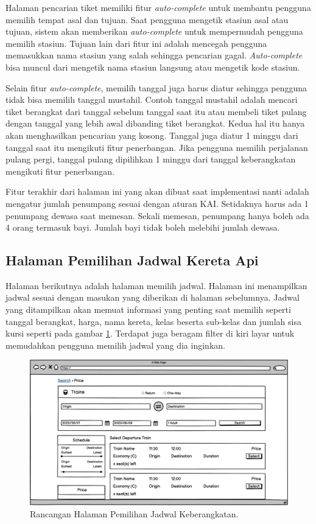 Halaman pencarian tiket memiliki fitur \textit{auto-complete} untuk membantu pengguna memilih tempat asal dan tujuan. Saat pengguna mengetik stasiun asal atau tujuan, sistem akan memberikan \textit{auto-complete} untuk mempermudah pengguna memilih stasiun. Tujuan lain dari fitur ini adalah mencegah pengguna memasukkan nama stasiun yang salah sehingga pencarian gagal. \textit{Auto-complete} bisa muncul dari mengetik nama stasiun langsung atau mengetik kode stasiun.

Selain fitur \textit{auto-complete}, memilih tanggal juga harus diatur sehingga pengguna tidak bisa memilih tanggal mustahil. Contoh tanggal mustahil adalah mencari tiket berangkat dari tanggal sebelum tanggal saat itu atau membeli tiket pulang dengan tanggal yang lebih awal dibanding tiket berangkat. Kedua hal itu hanya akan menghasilkan pencarian yang kosong. Tanggal juga diatur 1 minggu dari tanggal saat itu mengikuti fitur penerbangan. Jika pengguna memilih perjalanan pulang pergi, tanggal pulang dipilihkan 1 minggu dari tanggal keberangkatan mengikuti fitur penerbangan.

Fitur terakhir dari halaman ini yang akan dibuat saat implementasi nanti adalah mengatur jumlah penumpang sesuai dengan aturan KAI. Setidaknya harus ada 1 penumpang dewasa saat memesan. Sekali memesan, penumpang hanya boleh ada 4 orang termasuk bayi. Jumlah bayi tidak boleh melebihi jumlah dewasa.

\subsection{Halaman Pemilihan Jadwal Kereta Api}
\label{subsec:rancanganpemilihanjadwal}

Halaman berikutnya adalah halaman memilih jadwal. Halaman ini menampilkan jadwal sesuai dengan masukan yang diberikan di halaman sebelumnya. Jadwal yang ditampilkan akan memuat informasi yang penting saat memilih seperti tanggal berangkat, harga, nama kereta, kelas beserta sub-kelas dan jumlah sisa kursi seperti pada gambar \ref{img:rancanganjadwalberangkat}. Terdapat juga beragam filter di kiri layar untuk memudahkan pengguna memilih jadwal yang dia inginkan.

\begin{figure}[H]
\center
\includegraphics[width=\textwidth,height=\textheight,keepaspectratio]{Gambar/Halaman Pemilihan Jadwal (Berangkat).png}
\caption{Rancangan Halaman Pemilihan Jadwal Keberangkatan.}
    \label{img:rancanganjadwalberangkat}
\end{figure}

